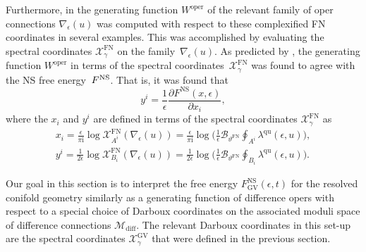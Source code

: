 \documentclass[pdftex]{sigma}
\numberwithin{equation}{section}
\begin{document}
Furthermore, in \cite{Hollands:Heun, Hollands:recipe} the generating function $W^\mathrm{oper}$ of the relevant family of oper connections $\nabla_\epsilon(u)$ was computed with respect to these complexified FN coordinates in several examples. This was accomplished by evaluating the spectral coordinates $\mathcal{X}_\gamma^{\mathrm{FN}}$ on the family~$\nabla_\epsilon(u)$. As predicted by \cite{Nekrasov:NRS}, the generating function $W^\mathrm{oper}$ in terms of the spectral coordinates~$\mathcal{X}_\gamma^\mathrm{FN}$ was found to agree with the
NS free energy~$F^{\rm NS}$. That is, it was found that
\begin{equation*}
y^i = \frac{1}{\epsilon} \frac{\partial F^{\mathrm{NS}}(x,\epsilon)}{\partial x_i},
\end{equation*}
where the $x_i$ and $y^i$ are defined in terms of the spectral coordinates $\mathcal{X}_\gamma^{\mathrm{FN}}$ as
\begin{gather*}
x_i = \frac{\epsilon}{\pi \mathrm{i}} \log \mathcal{X}^{\mathrm{FN}}_{A^i} (\nabla_\epsilon(u)) = \frac{\epsilon}{\pi \mathrm{i}} \log \bigg(\frac{1}{\epsilon} \mathcal{B}_{\vartheta^{\mathrm{FN}}} \oint_{A^i} \lambda^{\mathrm{qu}}(\epsilon,u) \bigg),\\
y^i = \frac{1}{2 \epsilon} \log \mathcal{X}^{\mathrm{FN}}_{B_i} (\nabla_\epsilon(u)) =\frac{1}{2 \epsilon} \log \bigg(\frac{1}{\epsilon} \mathcal{B}_{\vartheta^{\mathrm{FN}}} \oint_{B_i} \lambda^{\mathrm{qu}}(\epsilon,u) \bigg).
\end{gather*}

Our goal in this section is to interpret the free energy $F^{\mathrm{NS}}_\mathrm{GV}(\epsilon,t)$ for the resolved conifold geometry similarly as a generating function of difference opers with respect to a special choice of Darboux coordinates on the associated moduli space of difference connections $\mathcal{M}_\mathrm{diff}$. The relevant Darboux coordinates in this set-up are the spectral coordinates $\mathcal{X}_\gamma^\mathrm{GV}$ that were defined in the previous section.
\end{document}
